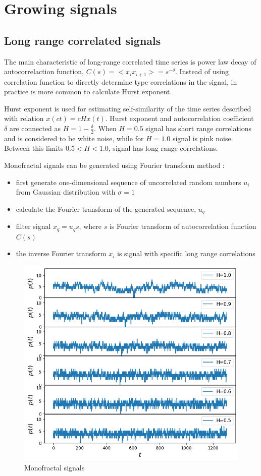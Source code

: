 \section{Growing signals}

\subsection{Long range correlated signals}

The main characteristic of long-range correlated time series is power law decay of autocorrelaction function, $C(s)= <x_i x_{i+1}> = s ^ {-\delta}$. Instead of using correlation function to directly determine type correlations in the signal, in practice is more common to calculate Hurst exponent.  

Hurst exponent is used for estimating self-similarity of the time series described with relation $x(ct)=cHx(t)$. Hurst exponent and autocorrelation coefficient $\delta$ are connected  as  $H = 1- \frac{\delta}{2}$. When $H=0.5$ signal has short range correlations and is considered to be white noise, while for $H=1.0$ signal is pink noise. Between this limits $0.5<H<1.0$, signal has long range correlations.

Monofractal signals can be generated using Fourier transform method \cite{makse1996method}:
\begin{itemize}
	\item first generate one-dimensional sequence of uncorrelated random numbers $u_i$ from Gaussian distribution with $\sigma=1$
	\item calculate the Fourier transform of the generated sequence, $u_q$
	\item filter signal $x_q = u_q s$, where $s$ is Fourier transform of autocorrelation function $C(s)$ 
	\item the inverse Fourier transform $x_i$ is signal with specific long range correlations 
\end{itemize}     

\begin{figure}[h!]
	\centering
	\includegraphics[width=0.7\linewidth]{Figures/monofractals.png}
	
	\caption{Monofractal signals}\label{fig:monofractals}
\end{figure}

